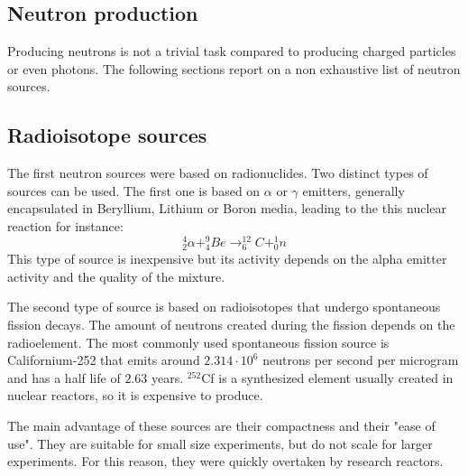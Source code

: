 \begin{refsection}
  \section{Neutron production}
  Producing neutrons is not a trivial task compared to producing charged particles or even photons. The following sections report on a non exhaustive list of neutron sources.

  \subsection{Radioisotope sources}
  The first neutron sources were based on radionuclides. Two distinct types of sources can be used. The first one is based on $\alpha$ or $\gamma$ emitters, generally encapsulated in Beryllium, Lithium or Boron media, leading to the this nuclear reaction for instance:
  \begin{equation}
    _{2}^{4}\alpha + _{4}^{9}Be \rightarrow _{6}^{12}C + _{0}^{1}n
  \end{equation}
  This type of source is inexpensive but its activity depends on the alpha emitter activity and the quality of the mixture.

  The second type of source is based on radioisotopes that undergo spontaneous fission decays. The amount of neutrons created during the fission depends on the radioelement. The most commonly used spontaneous fission source is
  Californium-252 that emits around $2.314 \cdot 10^{6}$ neutrons per second per microgram and has a half life of $2.63$ years.
  $^{252}$Cf is a synthesized element usually created in nuclear reactors, so it is expensive to produce.

  The main advantage of these sources are their compactness and their "ease of use". They are suitable for small size experiments, but do not scale for larger experiments. For this reason, they were quickly overtaken by research reactors.


\end{refsection}
